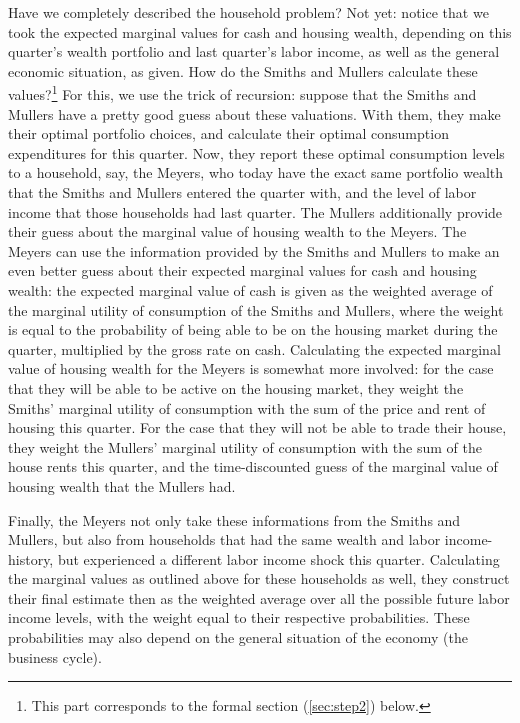 \documentclass[11pt]{article} %
\begin{document}
Have we completely described the household problem? Not yet: notice that we took the expected marginal values for cash and housing wealth, depending on this quarter's wealth portfolio and last quarter's labor income, as well as the general economic situation, as given. How do the Smiths and Mullers calculate these values?\footnote{This part corresponds to the formal section (\ref{sec:step2}) below.} For this, we use the trick of recursion: suppose that the Smiths and Mullers have a pretty good guess about these valuations. With them, they make their optimal portfolio choices, and calculate their optimal consumption expenditures for this quarter. Now, they report these optimal consumption levels to a household, say, the Meyers, who today have the exact same portfolio wealth that the Smiths and Mullers entered the quarter with, and the level of labor income that those households had last quarter. The Mullers additionally provide their guess about the marginal value of housing wealth to the Meyers. The Meyers can use the information provided by the Smiths and Mullers to make an even better guess about their expected marginal values for cash and housing wealth: the expected marginal value of cash is given as the weighted average of the marginal utility of consumption of the Smiths and Mullers, where the weight is equal to the probability of being able to be on the housing market during the quarter, multiplied by the gross rate on cash. Calculating the expected marginal value of housing wealth for the Meyers is somewhat more involved: for the case that they will be able to be active on the housing market, they weight the Smiths' marginal utility of consumption with the sum of the price and rent of housing this quarter. For the case that they will not be able to trade their house, they weight the Mullers' marginal utility of consumption with the sum of the house rents this quarter, and the time-discounted guess of the marginal value of housing wealth that the Mullers had.

Finally, the Meyers not only take these informations from the Smiths and Mullers, but also from households that had the same wealth and labor income-history, but experienced a different labor income shock this quarter. Calculating the marginal values as outlined above for these households as well, they construct their final estimate then as the weighted average over all the possible future labor income levels, with the weight equal to their respective probabilities. These probabilities may also depend on the general situation of the economy (the business cycle).
\end{document}
